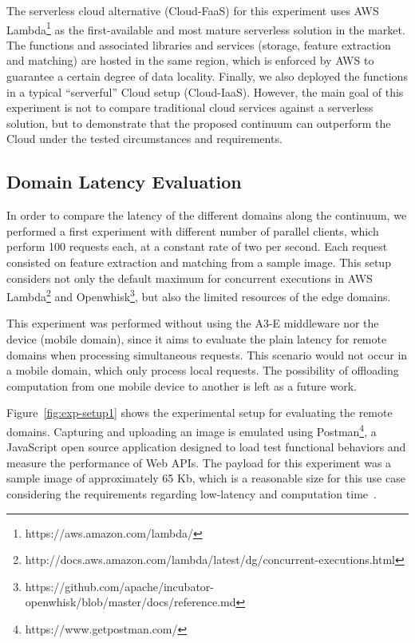 The serverless cloud alternative (Cloud-FaaS) for this experiment uses AWS Lambda\footnote{https://aws.amazon.com/lambda/} as the first-available and most mature serverless solution in the market. The functions and associated libraries and services (storage, feature extraction and matching) are hosted in the same region, which is enforced by AWS to guarantee a certain degree of data locality. Finally, we also deployed the functions in a typical ``serverful'' Cloud setup (Cloud-IaaS). However, the main goal of this experiment is not to compare traditional cloud services against a serverless solution, but to demonstrate that the proposed continuum can outperform the Cloud under the tested circumstances and requirements.


\subsection{Domain Latency Evaluation} 

In order to compare the latency of the different domains along the continuum, we performed a first experiment with different number of parallel clients, which perform 100 requests each, at a constant rate of two per second. Each request consisted on feature extraction and matching from a sample image. This setup considers not only the default maximum for concurrent executions in AWS Lambda\footnote{http://docs.aws.amazon.com/lambda/latest/dg/concurrent-executions.html} and Openwhisk\footnote{https://github.com/apache/incubator-openwhisk/blob/master/docs/reference.md}, but also the limited resources of the edge domains. 

This experiment was performed without using the A3-E middleware nor the device (mobile domain), since it aims to evaluate the plain latency for remote domains when processing simultaneous requests. This scenario would not occur in a mobile domain, which only process local requests. The possibility of offloading computation from one mobile device to another is left as a future work.

Figure~\ref{fig:exp-setup1} shows the experimental setup for evaluating the remote domains. Capturing and uploading an image is emulated using Postman\footnote{https://www.getpostman.com/}, a JavaScript open source application designed to load test functional behaviors and measure the performance of Web APIs. The  payload for this experiment was a sample image of approximately 65 Kb, which is a reasonable size for this use case considering the requirements regarding low-latency and computation time~\cite{rodriguez16mobile}. 

